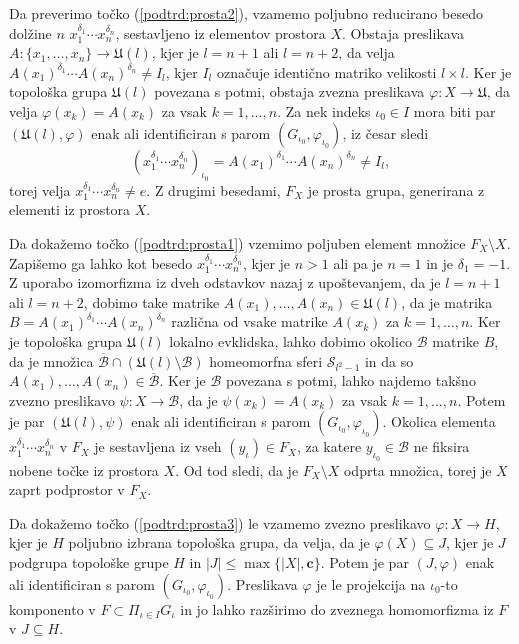 \documentclass[mat1]{fmfdelo}
\newcommand{\closure}[1]{\overline{#1}}
\begin{document}
\begin{dokaz}
Da preverimo točko (\ref{podtrd:prosta2}), vzamemo poljubno reducirano besedo dolžine $n$ $x_1^{\delta_1}\cdots x_n^{\delta_n}$, sestavljeno iz elementov prostora $X$.
Obstaja preslikava $A\colon\lbrace x_1, \dots,x_n\rbrace \to \mathfrak{U}(l)$, kjer je $l = n + 1$ ali $l = n + 2$, da velja $A(x_1)^{\delta_1}\cdots A(x_n)^{\delta_n} \neq I_l$, kjer $I_l$ označuje identično matriko velikosti $l \times l$. Ker je topološka grupa $\mathfrak{U}(l)$ povezana s potmi, obstaja zvezna preslikava $\varphi\colon X \to \mathfrak{U}$, da velja $\varphi(x_k) = A(x_k)$ za vsak $k = 1,\dots,n$. Za nek indeks $\iota_0 \in I$ mora biti par $(\mathfrak{U}(l), \varphi)$ enak ali identificiran s parom $(G_{\iota_0}, \varphi_{\iota_0})$, iz česar sledi
\[ (x_1^{\delta_1}\cdots x_n^{\delta_n})_{\iota_0} = A(x_1)^{\delta_1}\cdots A(x_n)^{\delta_n} \neq I_l, \]
torej velja $x_1^{\delta_1}\cdots x_n^{\delta_n} \neq e$. Z drugimi besedami, $F_X$ je prosta grupa, generirana z elementi iz prostora $X$.

Da dokažemo točko (\ref{podtrd:prosta1}) vzemimo poljuben element množice $F_X\setminus X$. Zapišemo ga lahko kot besedo $x_1^{\delta_1}\cdots x_n^{\delta_n}$, kjer je $n > 1$ ali pa je $n = 1$ in je $\delta_1 = -1$. Z uporabo izomorfizma iz dveh odstavkov nazaj z upoštevanjem, da je $l = n + 1$ ali $l = n + 2$, dobimo take matrike $A(x_1),\dots,A(x_n) \in \mathfrak{U}(l)$, da je matrika $B = A(x_1)^{\delta_1}\cdots A(x_n)^{\delta_n}$ različna od vsake matrike $A(x_k)$ za $k = 1,\dots,n$. Ker je topološka grupa $\mathfrak{U}(l)$ lokalno evklidska, lahko dobimo okolico $\mathcal{B}$ matrike $B$, da je množica $\closure{\mathcal{B}}\cap (\mathfrak{U}(l)\setminus \mathcal{B})$ homeomorfna sferi $\mathcal{S}_{l^2 - 1}$ in da so $A(x_1),\dots,A(x_n) \in \closure{\mathcal{B}}$. Ker je $\mathcal{B}$ povezana s potmi, lahko najdemo takšno zvezno preslikavo $\psi\colon X \to \mathcal{B}$, da je $\psi(x_k) = A(x_k)$ za vsak $k = 1,\dots,n$. Potem je par $(\mathfrak{U}(l), \psi)$ enak ali identificiran s parom $(G_{\iota_0}, \varphi_{\iota_0})$. Okolica elementa $x_1^{\delta_1}\cdots x_n^{\delta_n}$ v $F_X$ je sestavljena iz vseh $(y_\iota) \in F_X$, za katere $y_{\iota_0}\in\mathcal{B}$ ne fiksira nobene točke iz prostora $X$. Od tod sledi, da je $F_X \setminus X$ odprta množica, torej je $X$ zaprt podprostor v $F_X$.

Da dokažemo točko (\ref{podtrd:prosta3}) le vzamemo zvezno preslikavo $\varphi\colon X \to H$, kjer je $H$ poljubno izbrana topološka grupa, da velja, da je $\varphi(X) \subseteq J$, kjer je $J$ podgrupa topološke grupe $H$ in $|J| \leq \max\lbrace |X|, \mathbf{c}\rbrace$. Potem je par $(J, \varphi)$ enak ali identificiran s parom $(G_{\iota_0}, \varphi_{\iota_0})$. Preslikava $\varphi$ je le projekcija na $\iota_0$-to komponento v $F \subset \Pi_{\iota \in I}G_\iota$ in jo lahko razširimo do zveznega homomorfizma iz $F$ v $J \subseteq H$.
\end{dokaz}
\end{document}
